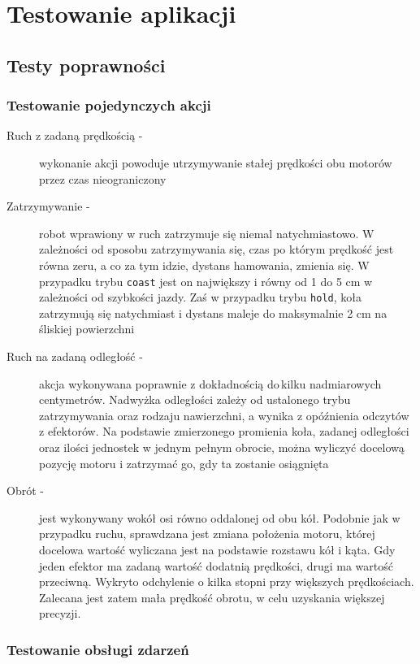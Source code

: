 \chapter{Testowanie aplikacji}
\label{ch:testowanie}

\section{Testy poprawności}

\subsection{Testowanie pojedynczych akcji}

\begin{description}
    \item[Ruch z zadaną prędkością -]wykonanie akcji powoduje utrzymywanie stałej prędkości obu motorów przez czas nieograniczony
    \item[Zatrzymywanie -]robot wprawiony w ruch zatrzymuje się niemal natychmiastowo. W zależności od sposobu zatrzymywania się, czas po którym prędkość jest równa zeru, a co za tym idzie, dystans hamowania, zmienia się. W\,przypadku trybu {\tt coast} jest on największy i równy od 1 do 5 cm w zależności od szybkości jazdy. Zaś w przypadku trybu {\tt hold}, koła zatrzymują się natychmiast i dystans maleje do maksymalnie 2 cm na śliskiej powierzchni
    \item[Ruch na zadaną odległość -]akcja wykonywana poprawnie z dokładnością do\,kilku nadmiarowych centymetrów. Nadwyżka odległości zależy od ustalonego trybu zatrzymywania oraz rodzaju nawierzchni, a wynika z opóźnienia odczytów z efektorów. Na podstawie zmierzonego promienia koła, zadanej odległości oraz ilości jednostek w jednym pełnym obrocie, można wyliczyć docelową pozycję motoru i zatrzymać go, gdy ta zostanie osiągnięta
    \item[Obrót -]jest wykonywany wokół osi równo oddalonej od obu kół. Podobnie jak w przypadku ruchu, sprawdzana jest zmiana położenia motoru, której docelowa wartość wyliczana jest na podstawie rozstawu kół i kąta. Gdy jeden efektor ma zadaną wartość dodatnią prędkości, drugi ma wartość przeciwną. Wykryto odchylenie o kilka stopni przy większych prędkościach. Zalecana jest zatem mała prędkość obrotu, w celu uzyskania większej precyzji.
\end{description}

\subsection{Testowanie obsługi zdarzeń}

